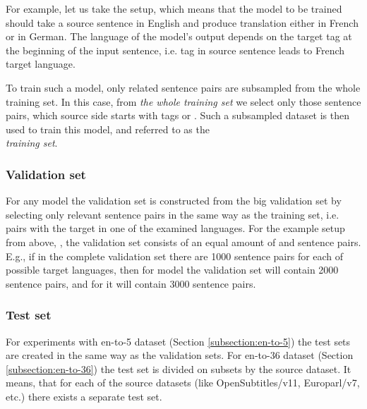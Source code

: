 For example, let us take the  setup, which means that
the model to be trained should take a source sentence in English and
produce translation either in French or in German.
The language of the model's output depends on the target tag at the beginning
of the input sentence, i.e.  tag in source sentence leads to French
target language.

To train such a model, only related sentence pairs are subsampled
from the whole training set.
In this case, from \emph{the whole training set} we select only those sentence
pairs, which source side starts with tags  or .
Such a subsampled dataset is then used to train this model, and referred to 
as the \\ \emph{ training set}.


\subsubsection*{Validation set}

For any model the validation set is constructed from the big validation set
by selecting only relevant sentence pairs in the same way as the training set,
i.e. pairs with the target in one of the examined languages.
For the example setup from above, , the validation set
consists of an equal amount of  and  sentence pairs.
E.g., if in the complete validation set there are 1000 sentence pairs for
each of possible target languages, then for 
model the validation set will contain 2000 sentence pairs, and for
 it will contain 3000 sentence pairs.

\subsubsection*{Test set}

For experiments with \gls{en-to-5} dataset (Section \ref{subsection:en-to-5})
the test sets are created in the same way as the validation sets.
For \gls{en-to-36} dataset (Section \ref{subsection:en-to-36})
the test set is divided on subsets by the source dataset.
It means, that for each of the source datasets (like OpenSubtitles/v11, 
Europarl/v7, etc.) there exists a separate test set.

